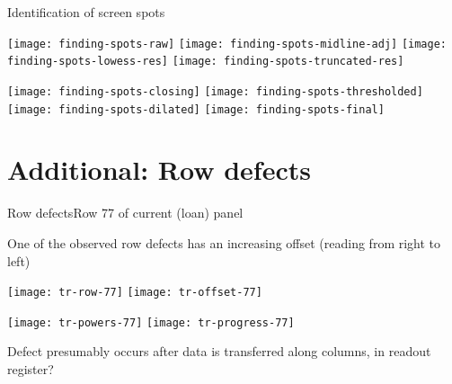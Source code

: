 \documentclass[8pt]{beamer}
\begin{document}

\begin{frame}[label = app-screen-spots-procedure]{Identification of screen spots}
	\begin{center}
		\texttt{[image: finding-spots-raw]}
		\texttt{[image: finding-spots-midline-adj]}
		\texttt{[image: finding-spots-lowess-res]}
		\texttt{[image: finding-spots-truncated-res]}
		
		\texttt{[image: finding-spots-closing]}
		\texttt{[image: finding-spots-thresholded]}
		\texttt{[image: finding-spots-dilated]}
		\texttt{[image: finding-spots-final]}
	\end{center}
	
	\hyperlink{screen-spots}{}	
\end{frame}

\section{Additional: Row defects}
\begin{frame}{Row defects}{Row 77 of current (loan) panel} %

	One of the observed row defects has an increasing offset (reading from right to left)
	\begin{center}
		\texttt{[image: tr-row-77]}
		\texttt{[image: tr-offset-77]}		
	
		\texttt{[image: tr-powers-77]}
		\texttt{[image: tr-progress-77]}
	\end{center}
	Defect presumably occurs after data is transferred along columns, in readout register?
\end{frame}

\end{document}
